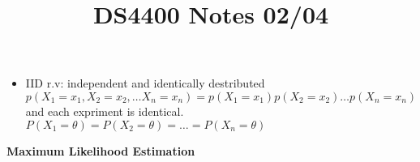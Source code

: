 \documentclass[12pt]{article}
\begin{document}
\begin{enumerate}
\begin{itemize}
                \item IID r.v: independent and identically destributed\\
                $p(X_1= x_1, X_2 = x_2, \dots X_n = x_n) = p(X_1 = x_1)p(X_2 = x_2)\dots p(X_n = x_n)$ and each expriment is identical.\\ $P(X_1 = \theta) = P(X_2 = \theta) = \dots = P(X_n = \theta)$
            \end{itemize}
        \end{enumerate}

        \title{DS4400 Notes 02/04}
        \maketitle

        \textbf{Maximum Likelihood Estimation}
\end{document}
